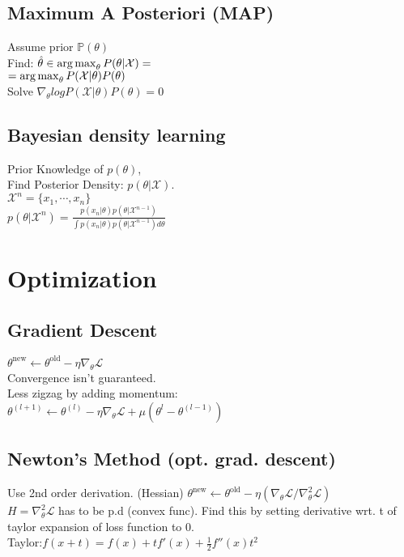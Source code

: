 \subsection*{Maximum A Posteriori (MAP)}
Assume prior $\mathbb{P}(\theta)$\\
Find: $\hat{\theta}\in \operatorname*{arg\,max}_\theta P(\theta|\mathcal{X}) =$\\
$=\operatorname*{arg\,max}_\theta P(\mathcal{X}|\theta)P(\theta)$\\
Solve $\nabla_\theta log P(\mathcal{X}|\theta)P(\theta)=0$

\subsection*{Bayesian density learning}
Prior Knowledge of $p(\theta)$,\\
Find Posterior Density: $p(\theta|\mathcal{X})$.\\
$\mathcal{X}^n=\{x_1, \cdots, x_n\}$\\
$p(\theta|\mathcal{X}^n)=\frac{p(x_n|\theta)p(\theta|\mathcal{X}^{n-1})}{\int p(x_n|\theta)p(\theta|\mathcal{X}^{n-1}) d\theta}$

\section*{Optimization}
\subsection*{Gradient Descent}
$\theta^{\mathrm{new}}\leftarrow\theta^{\mathrm{old}}-\eta\nabla_{\theta}\mathcal{L}$\\
Convergence isn't guaranteed.\\
Less zigzag by adding momentum: \\$\theta^{(l+1)}\leftarrow\theta^{(l)}-\eta\nabla_{\theta}\mathcal{L}+\mu(\theta^{l}-\theta^{(l-1)})$

\subsection*{Newton's Method (opt. grad. descent)}
Use 2nd order derivation. (Hessian)
$\theta^{\mathrm{new}}\leftarrow\theta^{\mathrm{old}}-\eta(\nabla_{\theta}\mathcal{L}/\nabla^2_{\theta}\mathcal{L})$\\
$H=\nabla^2_{\theta}\mathcal{L}$ has to be p.d (convex func).
Find this by setting derivative wrt. t of taylor expansion of loss function to 0. \\
Taylor:$f(x+t)=f(x)+t f'(x)+\frac{1}{2}f''(x)t^2$

